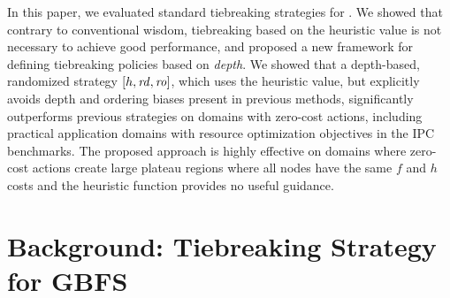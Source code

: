 In this paper, we evaluated standard tiebreaking
strategies for \astar.
We showed that contrary to conventional wisdom, tiebreaking based on the heuristic value is not necessary to achieve good performance, and proposed
a new framework for defining tiebreaking policies based on \emph{depth}.
We showed that a depth-based, randomized strategy $[h,{\mbox{\textit{rd}}},{\mbox{\textit{ro}}}]$, which uses the heuristic value, but explicitly avoids depth and ordering biases present in previous methods,
significantly outperforms previous strategies on domains with zero-cost actions, 
including practical application domains with resource optimization objectives in the IPC benchmarks.
The proposed approach is highly effective on domains where zero-cost actions create large plateau regions where all nodes have the same $f$ and $h$ costs
and the heuristic function provides no useful guidance.




\section{Background: Tiebreaking Strategy for GBFS}

